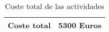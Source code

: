 \begin{table}[h]
    \centering
    \begin{tabular}{|c|c|}
    \hline
    Coste total & 5300 Euros \\ \hline
    \end{tabular}
    \caption {Coste total de las actividades}
\end{table}